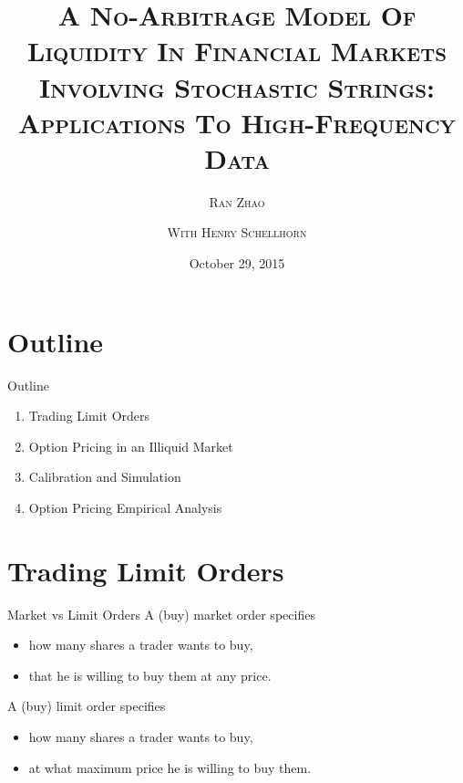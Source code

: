 \documentclass{beamer}
\title[A No-Arbitrage Model Of Liquidity In Financial Markets Involving Stochastic Strings: Applications To High-Frequency Data]{{\fontsize{12}{30} \textsc{A No-Arbitrage Model Of Liquidity In Financial Markets Involving Stochastic Strings: Applications To High-Frequency Data}}}
\author[Copyright \copyright Ran Zhao]{{\fontsize{10}{12}\textsc{Ran Zhao}} \qquad \qquad \qquad
	\qquad \qquad \qquad\qquad \qquad \qquad\qquad \qquad \qquad\qquad \qquad \qquad
	\and {\fontsize{8}{10}\textsc{With Henry Schellhorn}}
	}
\institute[CGU]{{\fontsize{9}{10}
	\textsc{Claremont Graduate University}
}}
\date[October 29, 2015]{{\fontsize{8}{8}October 29, 2015}}
\begin{document}
\begin{frame}[plain, shrink=0]
	\titlepage
\end{frame}

\section{Outline}
\begin{frame}[shrink=20]{{\color{cyan}Outline}}
\bigskip

\begin{enumerate}

\item Trading Limit Orders

\vspace{8pt}
\item Option Pricing in an Illiquid Market

\vspace{8pt}
\item Calibration and Simulation

\vspace{8pt}
\item Option Pricing Empirical Analysis

\end{enumerate}

\end{frame}

\section{Trading Limit Orders}

\begin{frame}[shrink=25]{{\color{cyan}Market vs Limit Orders}}
\bigskip
A (buy) market order specifies
\vspace{5pt}
\begin{itemize}
\item how many shares a trader wants to buy,
\vspace{5pt}
\item that he is willing to buy them at any price.
\end{itemize}

\bigskip
A (buy) limit order specifies
\vspace{5pt}
\begin{itemize}
\item how many shares a trader wants to buy,
\vspace{5pt}
\item at what maximum price he is willing to buy them.
\end{itemize}

\end{frame}
\end{document}
